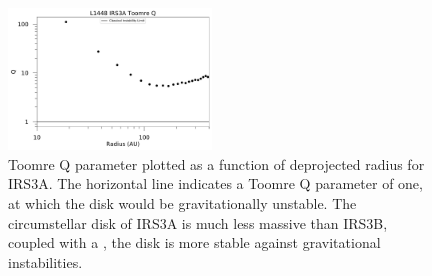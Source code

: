 \begin{figure}[H]
\begin{center}
\includegraphics[width=0.48\textwidth]{img/L1448N-toomre-Q-linear-xsec-cont_robust-05_wide.pdf}
\end{center}   
\caption{Toomre Q parameter plotted as a function of deprojected radius for IRS3A. The horizontal line indicates a Toomre Q parameter of one, at which the disk would be gravitationally unstable. The circumstellar disk of IRS3A is much less massive than IRS3B, coupled with a , the disk is more stable against gravitational instabilities.}\label{fig:irs3atoomreq}
\end{figure}






